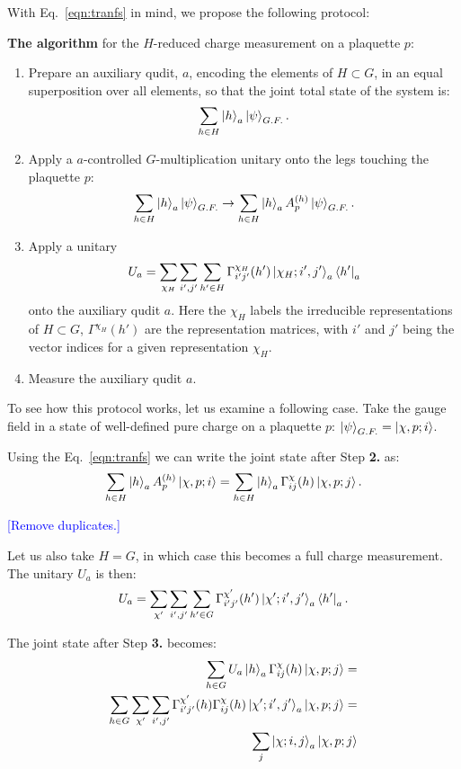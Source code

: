 \documentclass[two column]{article}
\newcommand{\jovan}[1]{\textcolor{blue}{[#1]}}
\begin{document}
With Eq.~\eqref{eqn:tranfs} in mind, we propose the following protocol:

\textbf{The algorithm} for the $H$-reduced charge measurement on a plaquette $p$:\begin{enumerate}
    \item Prepare an auxiliary qudit, $a$, encoding the elements of $H\subset G$, in an equal superposition over all elements, so that the joint total state of the system is: $$ \sum_{h \in H} \ket{h}_a\ket{\psi}_{G.F.}. $$
    \item Apply a $a$-controlled $G$-multiplication unitary onto the legs touching the plaquette $p$:$$ \sum_{h \in H} \ket{h}_a\ket{\psi}_{G.F.} \rightarrow \sum_{h \in H} \ket{h}_a A^{(h)}_p \ket{\psi}_{G.F.}. $$
    \item Apply a unitary $$ U_a = \sum_{\chi_H}\sum_{i', j'}\sum_{h'\in H}  \Gamma^{\chi_H}_{i'j'}(h')  \ket{\chi_H; i', j'}_a\bra{h'}_a $$ onto the auxiliary qudit $a$. Here the $\chi_H$ labels the irreducible representations of $H \subset G$, $\Gamma^{\chi_H}(h')$ are the representation matrices, with $i'$ and $j'$ being the vector indices for a given representation $\chi_H$.
    \item Measure the auxiliary qudit $a$.
\end{enumerate}

To see how this protocol works, let us examine a following case.
Take the gauge field in a state of well-defined pure charge on a plaquette $p$: $\ket{\psi}_{G.F.} = \ket{\chi, p; i}$.

Using the Eq.~\eqref{eqn:tranfs} we can write the joint state after Step \textbf{2.} as:
\begin{equation}
    \sum_{h \in H} \ket{h}_a A^{(h)}_p \ket{\chi, p; i} = \sum_{h \in H} \ket{h}_a \Gamma^{\chi}_{ij}(h) \ket{\chi, p; j}.
\end{equation}


\jovan{Remove duplicates.}

Let us also take $H = G$, in which case this becomes a full charge measurement. The unitary $U_a$ is then: \begin{equation}
    U_a = \sum_{\chi'}\sum_{i', j'}\sum_{h'\in G}  \Gamma^{\chi'}_{i'j'}(h') \ket{\chi'; i', j'}_a\bra{h'}_a.
\end{equation}

The joint state after Step \textbf{3.} becomes:\begin{equation}
    \begin{split}
        \sum_{h \in G} U_a\ket{h}_a \Gamma^{\chi}_{ij}(h) \ket{\chi, p; j} = \\
        \sum_{h \in G} \sum_{\chi'}\sum_{i', j'}  \Gamma^{\chi'}_{i'j'}(h)\Gamma^{\chi}_{ij}(h) \ket{\chi'; i', j'}_a \ket{\chi, p; j} =\\
        \sum_j\ket{\chi; i, j}_a \ket{\chi, p; j}
    \end{split}
\end{equation}
\end{document}
